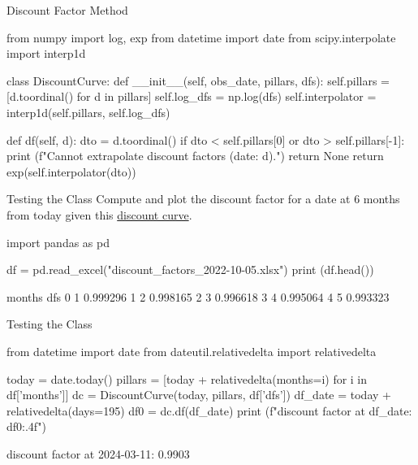\documentclass{beamer}
\begin{document}
\begin{frame}[fragile]{Discount Factor Method}
\begin{ipython}
from numpy import log, exp
from datetime import date
from scipy.interpolate import interp1d  
	
class DiscountCurve:
    def __init__(self, obs_date, pillars, dfs):
        self.pillars = [d.toordinal() for d in pillars]
        self.log_dfs = np.log(dfs)
        self.interpolator = interp1d(self.pillars, self.log_dfs)
        
    def df(self, d):
        dto = d.toordinal()   
        if dto < self.pillars[0] or dto > self.pillars[-1]:
            print (f"Cannot extrapolate discount factors (date: {d}).")
            return None
        return exp(self.interpolator(dto))
\end{ipython}
\end{frame}

\begin{frame}[fragile]{Testing the Class}
Compute and plot the discount factor for a date at 6 months from today given this \href{https://github.com/matteosan1/finance_course/raw/develop/input_files/discount_factors_2022-10-05.xlsx}{discount curve}.
\begin{ipython}
import pandas as pd

df = pd.read_excel("discount_factors_2022-10-05.xlsx")
print (df.head())
\end{ipython}
\begin{ioutput}
   months       dfs
0       1  0.999296
1       2  0.998165
2       3  0.996618
3       4  0.995064
4       5  0.993323
\end{ioutput}
\end{frame}

\begin{frame}[fragile]{Testing the Class}
\begin{ipython}
from datetime import date
from dateutil.relativedelta import relativedelta

today = date.today()
pillars = [today + relativedelta(months=i) for i in df['months']]
dc = DiscountCurve(today, pillars, df['dfs'])
df_date = today + relativedelta(days=195)
df0 = dc.df(df_date)
print (f"discount factor at {df_date}: {df0:.4f}")
\end{ipython}
\begin{ioutput}
discount factor at 2024-03-11: 0.9903
\end{ioutput}
\end{frame}
\end{document}
